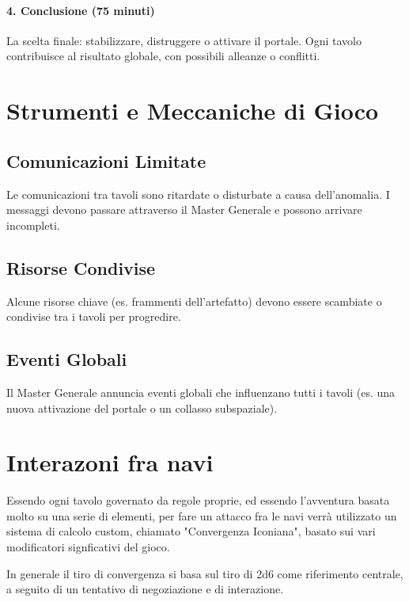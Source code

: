 \documentclass[letterpaper,twocolumn,openany,nodeprecatedcode]{dndbook}
\begin{document}
\paragraph{4. Conclusione (75 minuti)}

   La scelta finale: stabilizzare, distruggere o attivare il portale.
   Ogni tavolo contribuisce al risultato globale, con possibili alleanze o conflitti.

\section{ Strumenti e Meccaniche di Gioco
}

\subsection{ Comunicazioni Limitate
}

Le comunicazioni tra tavoli sono ritardate o disturbate a causa dell’anomalia. I messaggi devono passare attraverso il Master Generale e possono arrivare incompleti.

\subsection{ Risorse Condivise
}

Alcune risorse chiave (es. frammenti dell’artefatto) devono essere scambiate o condivise tra i tavoli per progredire.

\subsection{ Eventi Globali
}

Il Master Generale annuncia eventi globali che influenzano tutti i tavoli (es. una nuova attivazione del portale o un collasso subspaziale).

\section {Interazoni fra navi}
Essendo ogni tavolo governato da regole proprie, ed essendo l'avventura basata molto su una serie di elementi, per fare un attacco fra le navi verrà utilizzato un sistema di calcolo custom, chiamato "Convergenza Iconiana", basato sui vari modificatori signficativi del gioco. 

In generale il tiro di convergenza si basa sul tiro di 2d6 come riferimento centrale, a seguito di un tentativo di negoziazione e di interazione. 
\end{document}
